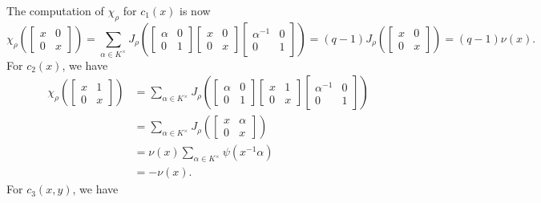 \documentclass[../main.tex]{subfiles}
\begin{document}
The computation of $\chi_\rho$ for $c_1(x)$ is now
\[\chi_\rho\left(\begin{bmatrix}
	x & 0 \\
	0 & x
\end{bmatrix}\right)=\sum_{\alpha\in K^\times}J_\rho\left(\begin{bmatrix}
	\alpha & 0 \\
	0 & 1
\end{bmatrix}\begin{bmatrix}
	x & 0 \\
	0 & x
\end{bmatrix}\begin{bmatrix}
	\alpha^{-1} & 0 \\
	0 & 1
\end{bmatrix}\right)=(q-1)J_\rho\left(\begin{bmatrix}
	x & 0 \\
	0 & x
\end{bmatrix}\right)=(q-1)\nu(x).\]
For $c_2(x)$, we have
\begin{align*}
	\chi_\rho\left(\begin{bmatrix}
		x & 1 \\
		0 & x
	\end{bmatrix}\right) &= \sum_{\alpha\in K^\times}J_\rho\left(\begin{bmatrix}
		\alpha & 0 \\
		0 & 1
	\end{bmatrix}\begin{bmatrix}
		x & 1 \\
		0 & x
	\end{bmatrix}\begin{bmatrix}
		\alpha^{-1} & 0 \\
		0 & 1
	\end{bmatrix}\right) \\
	&= \sum_{\alpha\in K^\times}J_\rho\left(\begin{bmatrix}
		x & \alpha \\
		0 & x
	\end{bmatrix}\right) \\
	&= \nu(x)\sum_{\alpha\in K^\times}\psi\left(x^{-1}\alpha\right) \\
	&= -\nu(x).
\end{align*}
For $c_3(x,y)$, we have
\end{document}
